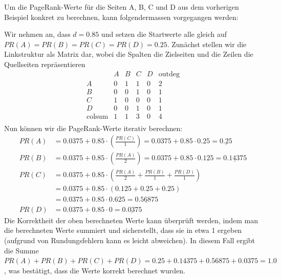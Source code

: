 \begin{myexample}
    Um die PageRank-Werte für die Seiten A, B, C und D aus dem vorherigen Beispiel konkret zu berechnen, kann folgendermassen vorgegangen werden:


    Wir nehmen an, dass $d=0.85$ und setzen die Startwerte alle gleich auf $PR(A)=PR(B)=PR(C)=PR(D)=0.25$. Zunächst stellen wir die Linkstruktur als Matrix dar, wobei die Spalten die Zielseiten und die Zeilen die Quellseiten repräsentieren
    \[
        \begin{array}{c|cccc|c}
                          & A & B & C & D & \text{outdeg} \\
            \hline
            A             & 0 & 1 & 1 & 0 & 2             \\
            B             & 0 & 0 & 1 & 0 & 1             \\
            C             & 1 & 0 & 0 & 0 & 1             \\
            D             & 0 & 0 & 1 & 0 & 1             \\
            \hline
            \text{colsum} & 1 & 1 & 3 & 0 & 4             \\
        \end{array}
    \]
    Nun können wir die PageRank-Werte iterativ berechnen:
    \[
        \begin{aligned}
            PR(A) & = 0.0375 + 0.85 \cdot \left(\frac{PR(C)}{1}\right) = 0.0375 + 0.85 \cdot 0.25 = \underline{0.25}     \\
            PR(B) & = 0.0375 + 0.85 \cdot \left(\frac{PR(A)}{2}\right) = 0.0375 + 0.85 \cdot 0.125 = \underline{0.14375} \\
            PR(C) & = 0.0375 + 0.85 \cdot \left(\frac{PR(A)}{2} + \frac{PR(B)}{1} + \frac{PR(D)}{1}\right)               \\
                  & =0.0375 + 0.85 \cdot (0.125 + 0.25 + 0.25)                                                           \\
                  & =0.0375 + 0.85 \cdot 0.625 = \underline{0.56875}                                                     \\
            PR(D) & = 0.0375 + 0.85 \cdot 0 = \underline{0.0375}
        \end{aligned}
    \]
    Die Korrektheit der oben berechneten Werte kann überprüft werden, indem man die berechneten Werte summiert und sicherstellt, dass sie in etwa 1 ergeben (aufgrund von Rundungsfehlern kann es leicht abweichen). In diesem Fall ergibt die Summe $PR(A) + PR(B) + PR(C) + PR(D) = 0.25 + 0.14375 + 0.56875 + 0.0375 = 1.0$, was bestätigt, dass die Werte korrekt berechnet wurden.


\end{myexample}
